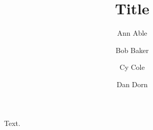 \documentclass{achemso}
\author{Ann Able}
\affiliation[A]{Univ A, Town}
\author{Bob Baker}
\affiliation[A]{Univ A, Town}
\author{Cy Cole}
\author{Dan Dorn}
\affiliation[Q]{Inst Q, Town}
\title{Title}
\begin{document}
Text.
\end{document}
